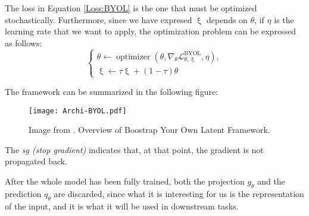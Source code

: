 The loss in Equation \eqref{Loss:BYOL} is the one that must be optimized stochastically. Furthermore, since we have expresed $\upxi$ depends on $\theta$, if $\eta$ is the learning rate that we want to apply, the optimization problem can be expressed as follows:
\[
\begin{cases}
    \theta \gets \operatorname{optimizer}\left(\theta,\nabla_\theta \mathcal L_{\theta,\upxi}^{\operatorname{BYOL}},\eta \right), \\
    \upxi \gets \tau \upxi + (1-\tau)\theta 
\end{cases}
\]

The framework can be summarized in the following figure:
\begin{figure}[H]
    \centering 
    \texttt{[image: Archi-BYOL.pdf]}
    \caption{Image from \citep{grill2020bootstrap}. Overview of Boostrap Your Own Latent Framework. }
\end{figure}

The \emph{sg (stop gradient)} indicates that, at that point, the gradient is not propagated back. 

After the whole model has been fully trained, both the projection $g_\theta$  and the prediction $q_\theta$ are discarded, since what it is interesting for us is the representation of the input, and it is what it will be used in downstream tasks.